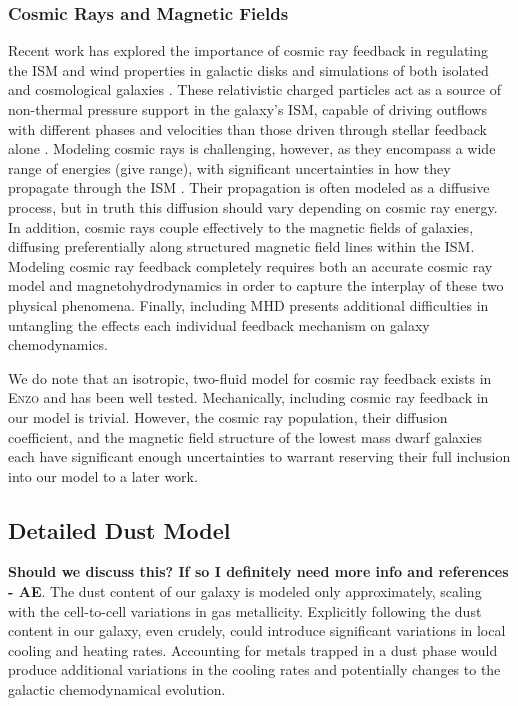 \documentclass[twocolumn]{aastex61}
\begin{document}
\subsubsection{Cosmic Rays and Magnetic Fields}
Recent work has explored the importance of cosmic ray feedback in regulating the ISM and wind properties in galactic disks \citep{Hanasz2013,GirichidisCR,Simpson2016,Farber2017} and simulations of both isolated \citep{SalemBryanCorlies,Salem2015,Pakmor2016,Ruszkowski2017} and cosmological galaxies \citep{SalemBryanHummels}. These relativistic charged particles act as a source of non-thermal pressure support in the galaxy's ISM, capable of driving outflows with different phases and velocities than those driven through stellar feedback alone \citep{SalemBryanCorlies}. Modeling cosmic rays is challenging, however, as they encompass a wide range of energies (give range), with significant uncertainties in how they propagate through the ISM \citep[e.g.][]{Wiener2017}. Their propagation is often modeled as a diffusive process, but in truth this diffusion should vary depending on cosmic ray energy. In addition, cosmic rays couple effectively to the magnetic fields of galaxies, diffusing preferentially along structured magnetic field lines within the ISM. Modeling cosmic ray feedback completely requires both an accurate cosmic ray model and magnetohydrodynamics in order to capture the interplay of these two physical phenomena. Finally, including MHD presents additional difficulties in untangling the effects each individual feedback mechanism on galaxy chemodynamics.

We do note that an isotropic, two-fluid model for cosmic ray feedback exists in  \textsc{Enzo} \citep{SalemBryan2014,Salem2015} and has been well tested. Mechanically, including cosmic ray feedback in our model is trivial. However, the cosmic ray population, their diffusion coefficient, and the magnetic field structure of the lowest mass dwarf galaxies each have significant enough uncertainties to warrant reserving their full inclusion into our model to a later work.

\subsection{Detailed Dust Model}
\textbf{Should we discuss this? If so I definitely need more info and references - AE}.
The dust content of our galaxy is modeled only approximately, scaling with the cell-to-cell variations in gas metallicity. Explicitly following the dust content in our galaxy, even crudely, could introduce significant variations in local cooling and heating rates. Accounting for metals trapped in a dust phase would produce additional variations in the cooling rates and potentially changes to the galactic chemodynamical evolution. 
\end{document}

